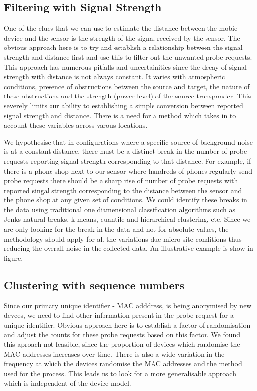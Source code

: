 \subsection{Filtering with Signal Strength}
One of the clues that we can use to estimate the distance between the mobie device and the sensor is the strength of the signal received by the sensor. 
The obvious approach here is to try and establish a relationship between the signal strength and distance first and use this to filter out the unwanted probe requests.
This approach has numerous pitfalls and uncertainities since the decay of signal strength with distance is not always constant.
It varies with atmospheric conditions, presence of obstructions between the source and target, the nature of these obstructions and the strength (power level) of the source transponder.
This severely limits our ability to establishing a simple conversion between reported signal strength and distance.
There is a need for a method which takes in to account these variables across varous locations.

We hypothesise that in configurations where a specific source of background noise is at a constant distance, there must be a distinct break in the number of probe requests reporting signal strength corresponding to that distance.
For example, if there is a phone shop next to our sensor where hundreds of phones regularly send probe requests there should be a sharp rise of number of probe requests with reported singal strength corresponding to the distance between the sensor and the phone shop at any given set of conditions.
We could identify these breaks in the data using traditional one diamensional classification algorithms such as Jenks natural breaks, k-means, quantile and hierarchical clustering, etc.
Since we are only looking for the break in the data and not for absolute values, the methodology should apply for all the variations due micro site conditions thus reducing the overall noise in the collected data.
An illustrative example is show in figure.

\subsection{Clustering with sequence numbers}

Since our primary unique identifier - MAC adddress, is being anonymised by new devces, we need to find other information present in the probe request for a unique identifier.
Obvious approach here is to establish a factor of randomisation and adjust the counts for these probe requests based on this factor.
We found this aproach not feasible, since the proportion of devices which randomise the MAC addresses increases over time.
There is also a wide variation in the frequency at which the devices randomise the MAC addresses and the method used for the process.
This leads us to look for a more generalisable approach which is independent of the device model.

